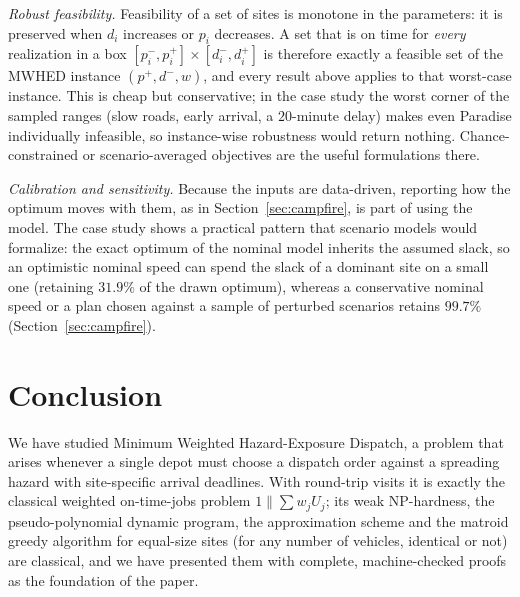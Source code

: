 \documentclass[pdflatex,sn-mathphys-ay]{sn-jnl}
\theoremstyle{thmstyleone}
\theoremstyle{thmstyletwo}
\theoremstyle{thmstylethree}
\begin{document}
\emph{Robust feasibility.} Feasibility of a set of sites is monotone in
the parameters: it is preserved when $d_i$ increases or $p_i$
decreases. A set that is on time for \emph{every} realization in a box
$[p_i^-,p_i^+]\times[d_i^-,d_i^+]$ is therefore exactly a feasible set
of the MWHED instance $(p^+,d^-,w)$, and every result above applies to
that worst-case instance. This is cheap but conservative; in the case
study the worst corner of the sampled ranges (slow roads, early arrival,
a $20$-minute delay) makes even Paradise individually infeasible, so
instance-wise robustness would return nothing. Chance-constrained or
scenario-averaged objectives are the useful formulations there.

\emph{Calibration and sensitivity.} Because the inputs are data-driven,
reporting how the optimum moves with them, as in
Section~\ref{sec:campfire}, is part of using the model. The case study
shows a practical pattern that scenario models would formalize: the
exact optimum of the nominal model inherits the assumed slack, so an
optimistic nominal speed can spend the slack of a dominant site on a small
one (retaining $31.9\%$ of the drawn optimum), whereas a conservative
nominal speed or a plan chosen against a sample of perturbed scenarios
retains $99.7\%$ (Section~\ref{sec:campfire}).

\section{Conclusion}\label{sec:conclusion}

We have studied Minimum Weighted Hazard-Exposure Dispatch, a problem that
arises whenever a single depot must choose a dispatch order against a
spreading hazard with site-specific arrival deadlines. With round-trip visits
it is exactly the classical weighted on-time-jobs problem
$1\|\sum w_jU_j$; its weak NP-hardness, the pseudo-polynomial dynamic
program, the approximation scheme and the matroid greedy algorithm for
equal-size sites (for any number of vehicles, identical or not) are
classical, and we have presented them with complete, machine-checked proofs
as the foundation of the paper.
\end{document}
